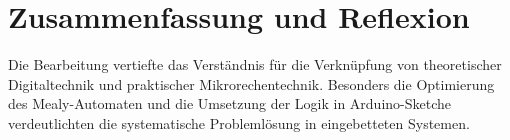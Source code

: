 

\section{Zusammenfassung und Reflexion}
Die Bearbeitung vertiefte das Verständnis für die Verknüpfung von theoretischer Digitaltechnik und praktischer Mikrorechentechnik. Besonders die Optimierung des Mealy-Automaten und die Umsetzung der Logik in Arduino-Sketche verdeutlichten die systematische Problemlösung in eingebetteten Systemen.

